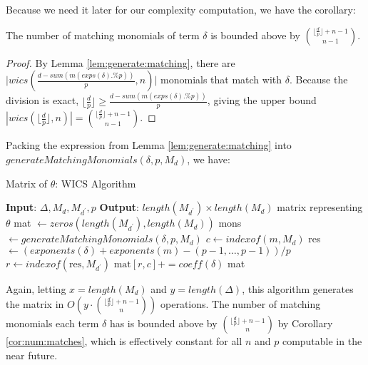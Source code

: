 Because we need it later for our complexity computation, we have the corollary:

\begin{cor}
    \label{cor:num:matches}
    The number of matching monomials of term $\delta$ is bounded above by $\binom{\lfloor \frac{d}{p} \rfloor + n - 1}{n - 1}$.
\end{cor}

\begin{proof}
    By Lemma \ref{lem:generate:matching}, there are $\Big |wics \left(\frac{d - sum(m(exps(\delta) .\% p))}{p}, n \right) \Big |$ monomials that match with $\delta$.
    Because the division is exact, $\lfloor \frac{d}{p} \rfloor \geq \frac{d - sum(m(exps(\delta) .\% p))}{p}$,
    giving the upper bound $|wics(\lfloor \frac{d}{p} \rfloor, n)| = \binom{\lfloor \frac{d}{p} \rfloor + n - 1}{n - 1}$.
\end{proof}

Packing the expression from Lemma \ref{lem:generate:matching} into $generateMatchingMonomials(\delta, p, M_d)$, we have:

\begin{algorithm}[H]
    \caption{Matrix of $\theta$: WICS Algorithm}
    \label{alg:matrix:WICS}
    \begin{algorithmic}[1]
    \State \textbf{Input}: $\Delta, M_{d}, M_{d^{\prime}}, p$
    \State \textbf{Output}: $length(M_{d^{\prime}}) \times length(M_{d})$ matrix representing $\theta$
    \State mat $\gets zeros(length(M_{d^{\prime}}), length(M_{d}))$
    \For{$\delta \in \Delta$}
        \State mons $\gets generateMatchingMonomials(\delta, p, M_{d})$
		    \State $c \gets indexof(m,M_{d})$
			\State res $\gets (exponents(\delta) + exponents(m) - (p-1, \ldots, p-1)) / p$
			\State $r \gets indexof(\text{res},M_{d^{\prime}})$
            \State $\text{mat}[r, c] += coeff(\delta)$
        \EndFor
    \EndFor
    \State \Return mat
    \end{algorithmic}
\end{algorithm}

Again, letting $x = length(M_d)$ and $y = length(\Delta)$, this algorithm generates the matrix in $O \left( y \cdot \binom{\lfloor \frac{d}{p} \rfloor + n - 1}{n} \right)$ operations.
The number of matching monomials each term $\delta$ has is bounded above by $\binom{\lfloor \frac{d}{p} \rfloor + n - 1}{n}$ by Corollary \ref{cor:num:matches}, which is effectively constant for all $n$ and $p$ computable in the near future.

